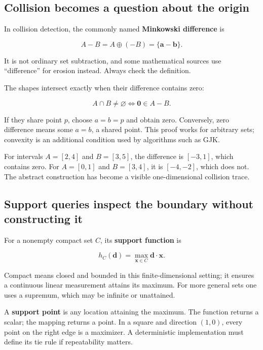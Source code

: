 \subsection{Collision becomes a question about the origin}\label{01-foundations-i-ch018-collision-becomes-a-question-about-the-origin}

In collision detection, the commonly named \textbf{Minkowski difference} is

\[
A-B=A\oplus(-B)=\{\mathbf a-\mathbf b\}.
\]

It is not ordinary set subtraction, and some mathematical sources use ``difference'' for erosion instead. Always check the definition.

The shapes intersect exactly when their difference contains zero:

\[
A\cap B\ne\varnothing\iff\mathbf0\in A-B.
\]

If they share point \(p\), choose \(a=b=p\) and obtain zero. Conversely, zero difference means some \(a=b\), a shared point. This proof works for arbitrary sets; convexity is an additional condition used by algorithms such as GJK.

For intervals \(A=[2,4]\) and \(B=[3,5]\), the difference is \([-3,1]\), which contains zero. For \(A=[0,1]\) and \(B=[3,4]\), it is \([-4,-2]\), which does not. The abstract construction has become a visible one-dimensional collision trace.

\subsection{Support queries inspect the boundary without constructing it}\label{01-foundations-i-ch018-support-queries-inspect-the-boundary-without-constructing-it}

For a nonempty compact set \(C\), its \textbf{support function} is

\[
h_C(\mathbf d)=\max_{\mathbf x\in C}\mathbf d\cdot\mathbf x.
\]

Compact means closed and bounded in this finite-dimensional setting; it ensures a continuous linear measurement attains its maximum. For more general sets one uses a supremum, which may be infinite or unattained.

A \textbf{support point} is any location attaining the maximum. The function returns a scalar; the mapping returns a point. In a square and direction \((1,0)\), every point on the right edge is a maximizer. A deterministic implementation must define its tie rule if repeatability matters.

